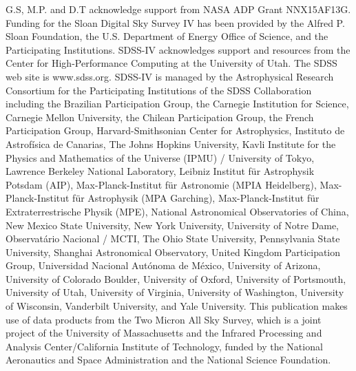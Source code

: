 \documentclass[manuscript]{aastex6}
\begin{document}
G.S, M.P. and D.T acknowledge support from NASA ADP Grant NNX15AF13G. 
Funding for the Sloan Digital Sky Survey IV has been provided by the Alfred P.
Sloan Foundation, the U.S. Department of Energy Office of Science, and the
Participating Institutions. SDSS-IV acknowledges support and resources from the
Center for High-Performance Computing at the University of Utah. The SDSS web
site is www.sdss.org. SDSS-IV is managed by the Astrophysical Research
Consortium for the Participating Institutions of the SDSS Collaboration
including the Brazilian Participation Group, the Carnegie Institution for
Science, Carnegie Mellon University, the Chilean Participation Group, the
French Participation Group, Harvard-Smithsonian Center for Astrophysics,
Instituto de Astrof\'isica de Canarias, The Johns Hopkins University, Kavli
Institute for the Physics and Mathematics of the Universe (IPMU) / University
of Tokyo, Lawrence Berkeley National Laboratory, Leibniz Institut f\"ur
Astrophysik Potsdam (AIP), Max-Planck-Institut f\"ur Astronomie (MPIA
Heidelberg), Max-Planck-Institut f\"ur Astrophysik (MPA Garching),
Max-Planck-Institut f\"ur Extraterrestrische Physik (MPE), National
Astronomical Observatories of China, New Mexico State University, New York
University, University of Notre Dame, Observat\'ario Nacional / MCTI, The Ohio
State University, Pennsylvania State University, Shanghai Astronomical
Observatory, United Kingdom Participation Group, Universidad Nacional
Aut\'onoma de M\'exico, University of Arizona, University of Colorado Boulder,
University of Oxford, University of Portsmouth, University of Utah, University
of Virginia, University of Washington, University of Wisconsin, Vanderbilt
University, and Yale University.  This publication makes use of data products
from the Two Micron All Sky Survey, which is a joint project of the University
of Massachusetts and the Infrared Processing and Analysis Center/California
Institute of Technology, funded by the National Aeronautics and Space
Administration and the National Science Foundation. 



\onecolumngrid




\end{document}
